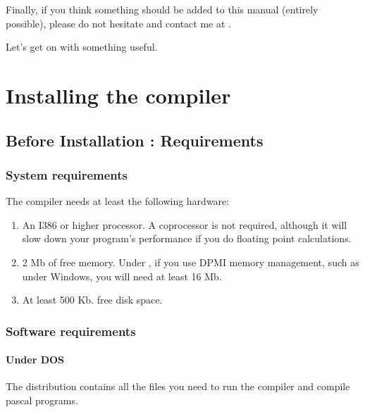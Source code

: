 \documentclass{report}
\begin{document}
Finally, if you think something should be added to this manual 
(entirely possible), please do not hesitate and contact me at 
.

Let's get on with something useful.


\chapter{Installing the compiler}
\label{ch:Installation}

\section{Before Installation : Requirements}

%
%
\subsection{System requirements}
The compiler needs at least the following hardware:
\begin{enumerate}
\item An I386 or higher processor. A coprocessor is not required, although it
will slow down your program's performance if you do floating point calculations.
\item 2 Mb of free memory. Under \dos, if you use DPMI memory management,
such as under Windows, you will need at least 16 Mb.
\item At least 500 Kb. free disk space.
\end{enumerate}

%
%

\subsection{Software requirements}

\subsubsection{Under DOS}
The \dos distribution contains all the files you need to run the compiler
and compile pascal programs.
\end{document}
